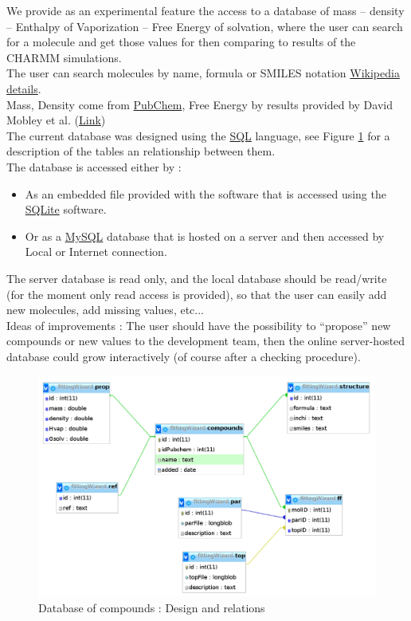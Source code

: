 \documentclass[12pt,a4paper]{article}
\begin{document}
We provide as an experimental feature the access to a database of 
mass -- density -- Enthalpy of Vaporization -- Free Energy of solvation, where the user can search 
for a molecule and get those values for then comparing to results of the CHARMM simulations.\\

The user can search molecules by name, formula or SMILES notation 
\href{http://en.wikipedia.org/wiki/Simplified_molecular-input_line-entry_system}{Wikipedia 
details}.\\

Mass, Density come from \href{https://pubchem.ncbi.nlm.nih.gov/search/}{PubChem}, Free Energy by 
results provided by David Mobley et al. (\href{http://escholarship.org/uc/item/6sd403pz}{Link})\\

The current database was designed using the \href{http://en.wikipedia.org/wiki/SQL}{SQL} 
language, see Figure \ref{dbFig} for a description of the tables an relationship between them.\\

The database is accessed either by : 
\begin{itemize}
\item As an embedded file provided with the software that is accessed using the 
\href{http://www.sqlite.org/}{SQLite} software.
\item Or as a \href{http://www.mysql.com/}{MySQL} database that is hosted on a server and then 
accessed by Local or Internet connection.
\end{itemize}

The server database is read only, and the local database should be read/write (for the moment only 
read access is provided), so that the user can easily add new molecules, add missing values, 
etc...\\

Ideas of improvements :
The user should have the possibility to ``propose'' new compounds or new values to the 
development team, then the online server-hosted database could grow interactively (of course after 
a checking procedure).

\begin{figure}[h!]
\centering
\includegraphics[width=0.9\linewidth]{pics/db}
\caption{Database of compounds : Design and relations}
\label{dbFig}
\end{figure}
\end{document}
